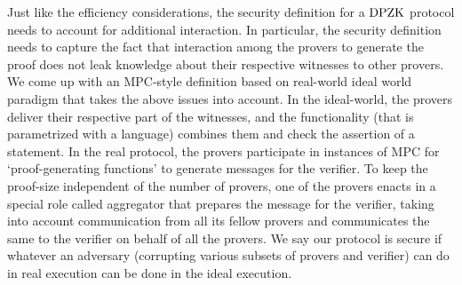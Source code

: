 
Just like the efficiency considerations, the security definition for a $\text{DPZK}$ protocol needs to account for additional interaction. 
In particular, the security definition needs to capture the fact that interaction among the provers to generate the proof does not 
leak knowledge about their respective witnesses to other provers. 
We come up with an MPC-style definition based on real-world ideal world paradigm \cite{Canetti00,Goldreich2001,Lindell17,CohenL14}  
that takes the above issues into account. In the ideal-world, the provers deliver their respective part of the witnesses, 
and the functionality (that is parametrized with a language) combines them and check the assertion of a statement. 
In the real protocol, the provers participate in instances of MPC for `proof-generating functions' to generate messages for the verifier. 
To keep the proof-size independent of the number of provers, one of the provers enacts in a special role called 
aggregator that prepares the message for the verifier, taking into account communication from all its fellow provers 
and communicates the same to the verifier on behalf of all the provers. We say our protocol is secure if whatever an 
adversary (corrupting various subsets of provers and verifier) can do in real execution can be done in the ideal execution. 
